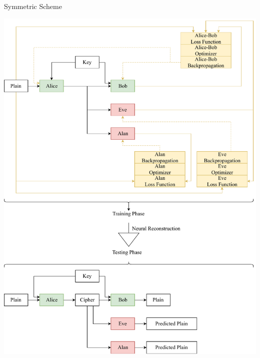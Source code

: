 \documentclass[a4paper, 12pt]{report}
\begin{document}
\newpage
\begin{blockfigure}{ Symmetric Scheme}
	\begin{center}
		\includegraphics[width = \textwidth]{symmetricScheme}
	\end{center}
\end{blockfigure}
\newpage
\end{document}

